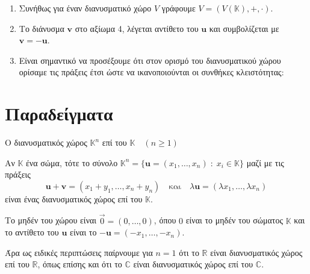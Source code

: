 \begin{rem}
\item {}
    \begin{enumerate}
        \item Συνήθως για έναν διανυσματικό χώρο $V$ γράφουμε 
            $V = (V(\mathbb{K}), +, \cdot) $.
        \item Το διάνυσμα $ \mathbf{v} $ στο αξίωμα 4, λέγεται 
            \textcolor{Col2}{αντίθετο} του $ \mathbf{u} $ και συμβολίζεται με 
            $ \mathbf{v} = - \mathbf{u} $.
        \item Είναι σημαντικό να προσέξουμε ότι στον ορισμό του διανυσματικού χώρου 
            ορίσαμε τις πράξεις έτσι ώστε να ικανοποιούνται οι συνθήκες κλειστότητας:
    \end{enumerate}
\end{rem}


\section{Παραδείγματα}

\begin{example}\label{ex:Rn}
    \textcolor{Col2}{Ο διανυσματικός χώρος $ \mathbb{K}^{n} $ 
    επί του $ \mathbb{K} \quad (n \geq 1) $}

    Αν $ \mathbb{K} $ ένα σώμα, τότε το σύνολο $ \mathbb{K}^{n} = 
    \{ \mathbf{u} = (x_{1},\ldots,x_{n}) \; : \; x_{i} \in \mathbb{K}\} $ 
    μαζί με τις πράξεις 
    \[
        \mathbf{u}+ \mathbf{v} = (x_{1}+ y_{1}, \ldots , x_{n}+y_{n}) 
        \quad \text{και} \quad \lambda \mathbf{u} = 
        ( \lambda x_{1}, \ldots, \lambda x_{n})
    \]
    είναι ένας διανυσματικός χώρος επί του $ \mathbb{K} $. 

    Το μηδέν του χώρου 
    είναι $ \vec{0} = (0,\ldots,0) $, όπου $0$ είναι το μηδέν του σώματος 
    $ \mathbb{K} $ και το αντίθετο του $ \mathbf{u} $ είναι το $ - \mathbf{u} =
    (- x_{1}, \ldots, - x_{n}) $.

    Άρα ως ειδικές περιπτώσεις παίρνουμε για $ n=1 $ ότι το $ \mathbb{R} $ 
    είναι διανυσματικός χώρος επί του $ \mathbb{R} $, όπως επίσης και ότι το 
    $ \mathbb{C} $ είναι διανυσματικός χώρος επί του $ \mathbb{C} $.
\end{example} 

